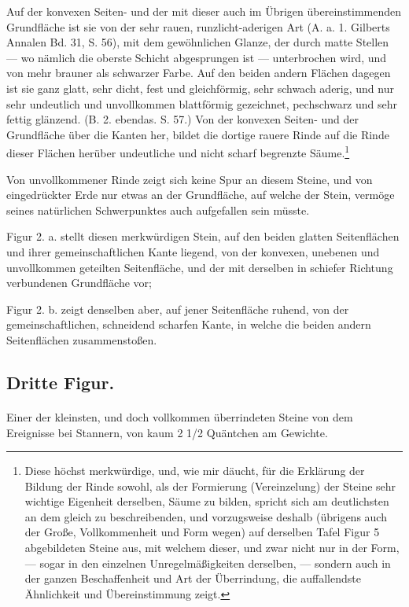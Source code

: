 \documentclass[a4paper, 11pt, oneside, german]{article}
\begin{document}
Auf der konvexen Seiten- und der mit dieser auch im Übrigen übereinstimmenden Grundfläche ist sie von der sehr rauen, runzlicht-aderigen Art (A. a. 1. Gilberts Annalen Bd. 31, S. 56), mit dem gewöhnlichen Glanze, der durch matte Stellen --- wo nämlich die oberste Schicht abgesprungen ist --- unterbrochen wird, und von mehr brauner als schwarzer Farbe. Auf den beiden andern Flächen dagegen ist sie ganz glatt, sehr dicht, fest und gleichförmig, sehr schwach aderig, und nur sehr undeutlich und unvollkommen blattförmig gezeichnet, pechschwarz und sehr fettig glänzend. (B. 2. ebendas. S. 57.) Von der konvexen Seiten- und der Grundfläche über die Kanten her, bildet die dortige rauere Rinde auf die Rinde dieser Flächen herüber undeutliche und nicht scharf begrenzte Säume.\footnote{Diese höchst merkwürdige, und, wie mir däucht, für die Erklärung der Bildung der Rinde sowohl, als der Formierung (Vereinzelung) der Steine sehr wichtige Eigenheit derselben, Säume zu bilden, spricht sich am deutlichsten an dem gleich zu beschreibenden, und vorzugsweise deshalb (übrigens auch der Große, Vollkommenheit und Form wegen) auf derselben Tafel Figur 5 abgebildeten Steine aus, mit welchem dieser, und zwar nicht nur in der Form, --- sogar in den einzelnen Unregelmäßigkeiten derselben, --- sondern auch in der ganzen Beschaffenheit und Art der Überrindung, die auffallendste Ähnlichkeit und Übereinstimmung zeigt.}

Von unvollkommener Rinde zeigt sich keine Spur an diesem Steine, und von eingedrückter Erde nur etwas an der Grundfläche, auf welche der Stein, vermöge seines natürlichen Schwerpunktes auch aufgefallen sein müsste.

Figur 2. a. stellt diesen merkwürdigen Stein, auf den beiden glatten Seitenflächen und ihrer gemeinschaftlichen Kante liegend, von der konvexen, unebenen und unvollkommen geteilten Seitenfläche, und der mit derselben in schiefer Richtung verbundenen Grundfläche vor;

Figur 2. b. zeigt denselben aber, auf jener Seitenfläche ruhend, von der gemeinschaftlichen, schneidend scharfen Kante, in welche die beiden andern Seitenflächen zusammenstoßen.

\subsection{Dritte Figur.}
\paragraph{}
Einer der kleinsten, und doch vollkommen überrindeten Steine von dem Ereignisse bei Stannern, von kaum 2 1/2 Quäntchen am Gewichte.
\end{document}

